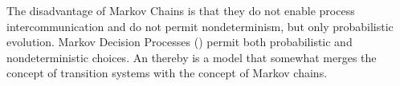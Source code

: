 \documentclass[preview]{standalone}
\begin{document}
The disadvantage of Markov Chains is that they do not enable process intercommunication and do not permit nondeterminism, but only probabilistic evolution. Markov Decision Processes (\mdpsN) permit both probabilistic and nondeterministic choices. An \mdpN thereby is a model that somewhat merges the concept of transition systems with the concept of Markov chains. 
%
%
\end{document}
